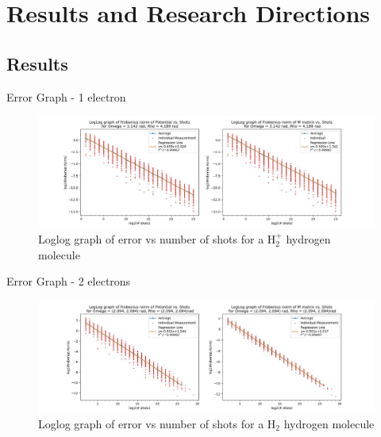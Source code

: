 \documentclass[professionalfonts]{beamer}
\begin{document}


\section{\textbf{Results and Research Directions}}

\subsection{\textbf{Results}}

\begin{frame}{Error Graph - 1 electron}
\begin{figure}[b]
	\centering
	\includegraphics[width=\textwidth]{../img/1e.jpg}
  \caption{Loglog graph of error vs number of shots for a $\text{H}_2^+$ hydrogen molecule}
  \label{fig:1derrorgraph}
\end{figure}
\end{frame}



\begin{frame}{Error Graph - 2 electrons}
\begin{figure}[b]
	\centering
	\includegraphics[width=\textwidth]{../img/2e-nonint.jpg}
  \caption{Loglog graph of error vs number of shots for a $\text{H}_2$ hydrogen molecule}
  \label{fig:2derrorgraph}
\end{figure}
\end{frame}
\end{document}
